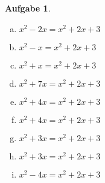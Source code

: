 \documentclass[12pt,fleqn]{article}
\theoremstyle{aufg}
\newtheorem{aufgabe}{Aufgabe}
\theoremstyle{bsp}
\begin{document}
 
    \begin{flushleft}
\begin{center}\end{center}\begin{aufgabe} ~ \\ 
\begin{multicols}{3} 
\begin{enumerate}[a)] 
\item 
$x^{2} - 2 x = x^{2} + 2 x + 3$
\item 
$x^{2} - x = x^{2} + 2 x + 3$
\item 
$x^{2} + x = x^{2} + 2 x + 3$
\item 
$x^{2} + 7 x = x^{2} + 2 x + 3$
\item 
$x^{2} + 4 x = x^{2} + 2 x + 3$
\item 
$x^{2} + 4 x = x^{2} + 2 x + 3$
\item 
$x^{2} + 3 x = x^{2} + 2 x + 3$
\item 
$x^{2} + 3 x = x^{2} + 2 x + 3$
\item 
$x^{2} - 4 x = x^{2} + 2 x + 3$
\end{enumerate} 
\end{multicols} 
\end{aufgabe} 
\end{flushleft} 
\end{document}
